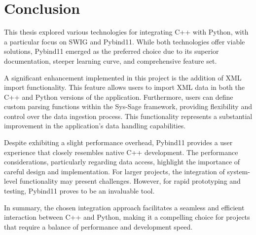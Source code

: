 \section{Conclusion}

This thesis explored various technologies for integrating C++ with Python, with a particular focus on SWIG and Pybind11. While both technologies offer viable solutions, Pybind11 emerged as the preferred choice due to its superior documentation, steeper learning curve, and comprehensive feature set.

A significant enhancement implemented in this project is the addition of XML import functionality. This feature allows users to import XML data in both the C++ and Python versions of the application. Furthermore, users can define custom parsing functions within the Sys-Sage framework, providing flexibility and control over the data ingestion process. This functionality represents a substantial improvement in the application's data handling capabilities.

Despite exhibiting a slight performance overhead, Pybind11 provides a user experience that closely resembles native C++ development. The performance considerations, particularly regarding data access, highlight the importance of careful design and implementation. For larger projects, the integration of system-level functionality may present challenges. However, for rapid prototyping and testing, Pybind11 proves to be an invaluable tool.

In summary, the chosen integration approach facilitates a seamless and efficient interaction between C++ and Python, making it a compelling choice for projects that require a balance of performance and development speed.
